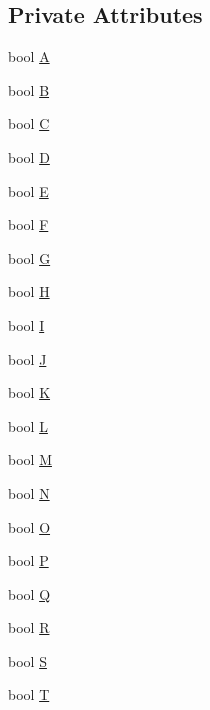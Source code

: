 \subsection*{Private Attributes}
\begin{DoxyCompactItemize}
\item 
bool \hyperlink{class_keyboard_a33ee9c98d3b2426fec7b69fd4f42fb9a}{A}
\item 
bool \hyperlink{class_keyboard_a6386fea4a95993853302e9bafb520eca}{B}
\item 
bool \hyperlink{class_keyboard_a8e9a644f450a387c8b0becfec29e0eba}{C}
\item 
bool \hyperlink{class_keyboard_a913ff21c18119ddf7a4185c84e0e7449}{D}
\item 
bool \hyperlink{class_keyboard_a10f9fdb7927cb81bba0d054c26509a7a}{E}
\item 
bool \hyperlink{class_keyboard_af271aa6fd76947941d20934dc86a0bb2}{F}
\item 
bool \hyperlink{class_keyboard_a2c602997ff88ff6b54a696397e5478f9}{G}
\item 
bool \hyperlink{class_keyboard_a5756caddc794320748593954cbd35a2a}{H}
\item 
bool \hyperlink{class_keyboard_a59f5f1879a371a750deaef44730f6c8e}{I}
\item 
bool \hyperlink{class_keyboard_a79e10d1e2486a150419889ac513386b9}{J}
\item 
bool \hyperlink{class_keyboard_a805724edf1245e28598089225bcae72e}{K}
\item 
bool \hyperlink{class_keyboard_ad314cbbe55e6d9d699f9c4a3d673dc0e}{L}
\item 
bool \hyperlink{class_keyboard_a655e239c891a0c77273f5651f77d752b}{M}
\item 
bool \hyperlink{class_keyboard_a9c13f7665efcec0323466f50080dd90f}{N}
\item 
bool \hyperlink{class_keyboard_ac2ef655c59d2d20ca9ac14b38281bd2b}{O}
\item 
bool \hyperlink{class_keyboard_a0a1ccbf5bdd2ca101d91f6aeb12b0003}{P}
\item 
bool \hyperlink{class_keyboard_a73542918c6ffdd4915925fff6aea1eb5}{Q}
\item 
bool \hyperlink{class_keyboard_a43732e3f8a2a179490d70bbca9c9cbf7}{R}
\item 
bool \hyperlink{class_keyboard_aafafb740df9ac23e0fdbac7b85ca5902}{S}
\item 
bool \hyperlink{class_keyboard_a82a8270c2f89be1d02deff45e5b05423}{T}
\item 

\end{DoxyCompactItemize}
